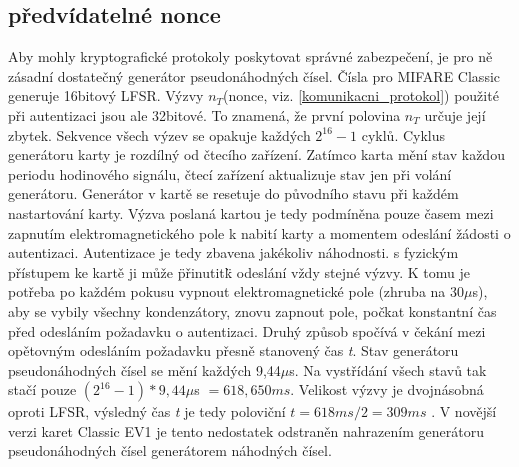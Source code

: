 \subsection{předvídatelné nonce}
Aby mohly kryptografické protokoly poskytovat správné zabezpečení, je pro ně zásadní dostatečný generátor pseudonáhodných čísel. Čísla pro MIFARE Classic generuje 16bitový LFSR. Výzvy $n_T$(nonce, viz. \ref{komunikacni_protokol}) použité při autentizaci jsou ale 32bitové. To znamená, že první polovina $n_T$ určuje její zbytek. Sekvence všech výzev se opakuje každých $2^{16} - 1$ cyklů\cite{Cryptanalisis}. Cyklus generátoru karty je rozdílný od čtecího zařízení. Zatímco karta mění stav každou periodu hodinového signálu, čtecí zařízení aktualizuje stav jen při volání generátoru\cite{Dismantling_Mifare_Classic}. Generátor v kartě se resetuje do původního stavu při každém nastartování karty. Výzva poslaná kartou je tedy podmíněna pouze časem mezi zapnutím elektromagnetického pole k nabití karty a momentem odeslání žádosti o autentizaci. Autentizace je tedy zbavena jakékoliv náhodnosti.  s fyzickým přístupem ke kartě ji může \"přinutit\" k odeslání vždy stejné výzvy. K tomu je potřeba po každém pokusu vypnout elektromagnetické pole (zhruba na 30$\mu$s), aby se vybily všechny kondenzátory, znovu zapnout pole, počkat konstantní čas před odesláním požadavku o autentizaci. Druhý způsob spočívá v čekání mezi opětovným odesláním požadavku přesně stanovený čas \emph{t}. Stav generátoru pseudonáhodných čísel se mění každých 9,44$\mu$s. Na vystřídání všech stavů tak stačí pouze $(2^{16} - 1) * 9,44\mu$s $= 618,650ms$. Velikost výzvy je dvojnásobná oproti LFSR, výsledný čas \emph{t} je tedy poloviční $t = 618ms/2 = 309ms$ \cite{Wirelessly_Pickpocketing}. V novější verzi karet Classic EV1 je tento nedostatek odstraněn nahrazením generátoru pseudonáhodných čísel generátorem náhodných čísel\cite{MIFARE_Classic_Official_about}.



